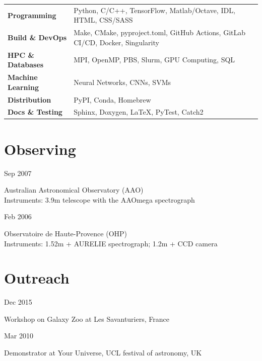 \documentclass[a4paper,10pt]{article}
\newlength{\cvdatew}
\newcommand{\cvline}[2]{%
  \vspace{2pt}%
  \noindent\begin{minipage}[t]{\cvdatew}%
    \raggedright\small\color{muted}#1%
  \end{minipage}%
  \hspace{0.6em}%
  \begin{minipage}[t]{\dimexpr\linewidth-\cvdatew-0.6em\relax}%
    #2%
  \end{minipage}%
  \vspace{2pt}%
}
\begin{document}
\begin{tabularx}{\linewidth}{@{}lX@{}}
  \small\bfseries\color{muted}Programming &
    Python, C/C++, TensorFlow, Matlab/Octave, IDL, HTML, CSS/SASS \\[3pt]
  \small\bfseries\color{muted}Build \& DevOps &
    Make, CMake, pyproject.toml, GitHub Actions, GitLab CI/CD, Docker, Singularity \\[3pt]
  \small\bfseries\color{muted}HPC \& Databases &
    MPI, OpenMP, PBS, Slurm, GPU Computing, SQL \\[3pt]
  \small\bfseries\color{muted}Machine Learning &
    Neural Networks, CNNs, SVMs \\[3pt]
  \small\bfseries\color{muted}Distribution &
    PyPI, Conda, Homebrew \\[3pt]
  \small\bfseries\color{muted}Docs \& Testing &
    Sphinx, Doxygen, \LaTeX, PyTest, Catch2 \\
\end{tabularx}

\section{Observing}

\cvline{Sep 2007}{Australian Astronomical Observatory (AAO)\\
  {\small\color{muted}Instruments: 3.9m telescope with the AAOmega spectrograph}}

\cvline{Feb 2006}{Observatoire de Haute-Provence (OHP)\\
  {\small\color{muted}Instruments: 1.52m + AURELIE spectrograph; 1.2m + CCD camera}}

\section{Outreach}

\cvline{Dec 2015}{Workshop on Galaxy Zoo at Les Savanturiers, France}
\cvline{Mar 2010}{Demonstrator at Your Universe, UCL festival of astronomy, UK}
\end{document}
